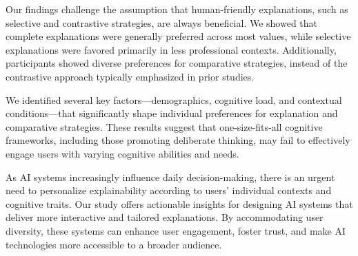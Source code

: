 Our findings challenge the assumption that human-friendly explanations, such as selective and contrastive strategies, are always beneficial. We showed that complete explanations were generally preferred across most values, while selective explanations were favored primarily in less professional contexts. Additionally, participants showed diverse preferences for comparative strategies, instead of the contrastive approach typically emphasized in prior studies.

We identified several key factors---demographics, cognitive load, and contextual conditions---that significantly shape individual preferences for explanation and comparative strategies. These results suggest that one-size-fits-all cognitive frameworks, including those promoting deliberate thinking, may fail to effectively engage users with varying cognitive abilities and needs.

As AI systems increasingly influence daily decision-making, there is an urgent need to personalize explainability according to users' individual contexts and cognitive traits. Our study offers actionable insights for designing AI systems that deliver more interactive and tailored explanations. By accommodating user diversity, these systems can enhance user engagement, foster trust, and make AI technologies more accessible to a broader audience.
